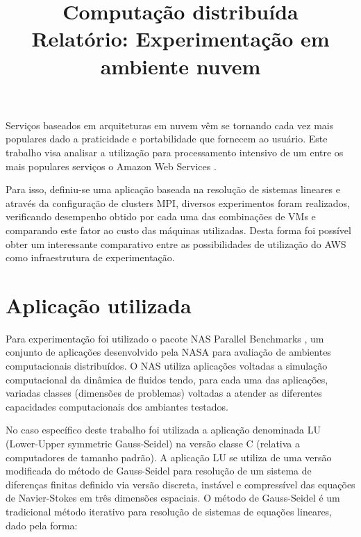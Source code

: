 \documentclass[a4paper,11pt]{article}
\title{\Large{Computação distribuída} \\ Relatório: Experimentação em ambiente nuvem}
\begin{document}
\maketitle


\author{
}

\vspace{1.0cm}

Serviços baseados em arquiteturas em nuvem vêm se tornando cada vez mais populares dado a praticidade e portabilidade que fornecem ao usuário. Este trabalho visa analisar a utilização para processamento intensivo de um entre os mais populares serviços o Amazon Web Services \cite{AWS}. 

Para isso, definiu-se uma aplicação baseada na resolução de sistemas lineares e através da configuração de clusters MPI, diversos experimentos foram realizados, verificando desempenho obtido por cada uma das combinações de VMs e comparando este fator ao custo das máquinas utilizadas. Desta forma foi possível obter um interessante comparativo entre as possibilidades de utilização do AWS como infraestrutura de experimentação.

\vspace{0.3cm}

\section{Aplicação utilizada}

\vspace{0.3cm}

Para experimentação foi utilizado o pacote NAS Parallel Benchmarks \cite{NAS}, um conjunto de aplicações desenvolvido pela NASA para avaliação de ambientes computacionais distribuídos. O NAS utiliza aplicações voltadas a simulação computacional da dinâmica de fluidos tendo, para cada uma das aplicações, variadas classes (dimensões de problemas) voltadas a atender as diferentes capacidades computacionais dos ambiantes testados.

No caso específico deste trabalho foi utilizada a aplicação denominada LU (Lower-Upper symmetric Gauss-Seidel) na versão classe C (relativa a computadores de tamanho padrão). 
A aplicação LU se utiliza de uma versão modificada do método de Gauss-Seidel para resolução de um sistema de diferenças finitas definido via versão discreta, instável e compressível das equações de Navier-Stokes em três dimensões espaciais. 
O método de Gauss-Seidel é um tradicional método iterativo para resolução de sistemas de equações lineares, dado pela forma:
\end{document}
